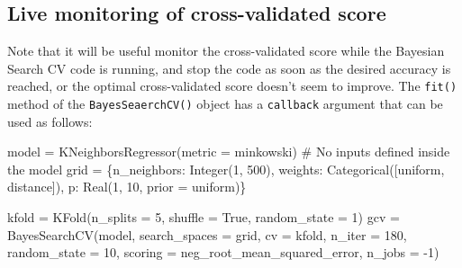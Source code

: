 \documentclass[
  letterpaper,
  DIV=11,
  numbers=noendperiod]{scrreprt}
\newenvironment{Shaded}{\begin{snugshade}}{\end{snugshade}}
\newcommand{\CommentTok}[1]{\textcolor[rgb]{0.37,0.37,0.37}{#1}}
\newcommand{\DecValTok}[1]{\textcolor[rgb]{0.68,0.00,0.00}{#1}}
\newcommand{\NormalTok}[1]{\textcolor[rgb]{0.00,0.23,0.31}{#1}}
\newcommand{\OperatorTok}[1]{\textcolor[rgb]{0.37,0.37,0.37}{#1}}
\newcommand{\StringTok}[1]{\textcolor[rgb]{0.13,0.47,0.30}{#1}}
\newcommand{\VariableTok}[1]{\textcolor[rgb]{0.07,0.07,0.07}{#1}}
\begin{document}
\subsection{Live monitoring of cross-validated
score}\label{live-monitoring-of-cross-validated-score}

Note that it will be useful monitor the cross-validated score while the
Bayesian Search CV code is running, and stop the code as soon as the
desired accuracy is reached, or the optimal cross-validated score
doesn't seem to improve. The \texttt{fit()} method of the
\texttt{BayesSeaerchCV()} object has a \texttt{callback} argument that
can be used as follows:

\begin{Shaded}
\begin{Highlighting}[]
\NormalTok{model }\OperatorTok{=}\NormalTok{ KNeighborsRegressor(metric }\OperatorTok{=} \StringTok{\textquotesingle{}minkowski\textquotesingle{}}\NormalTok{) }\CommentTok{\# No inputs defined inside the model}
\NormalTok{grid }\OperatorTok{=}\NormalTok{ \{}\StringTok{\textquotesingle{}n\_neighbors\textquotesingle{}}\NormalTok{: Integer(}\DecValTok{1}\NormalTok{, }\DecValTok{500}\NormalTok{), }\StringTok{\textquotesingle{}weights\textquotesingle{}}\NormalTok{: Categorical([}\StringTok{\textquotesingle{}uniform\textquotesingle{}}\NormalTok{, }\StringTok{\textquotesingle{}distance\textquotesingle{}}\NormalTok{]), }
       \StringTok{\textquotesingle{}p\textquotesingle{}}\NormalTok{: Real(}\DecValTok{1}\NormalTok{, }\DecValTok{10}\NormalTok{, prior }\OperatorTok{=} \StringTok{\textquotesingle{}uniform\textquotesingle{}}\NormalTok{)\} }

\NormalTok{kfold }\OperatorTok{=}\NormalTok{ KFold(n\_splits }\OperatorTok{=} \DecValTok{5}\NormalTok{, shuffle }\OperatorTok{=} \VariableTok{True}\NormalTok{, random\_state }\OperatorTok{=} \DecValTok{1}\NormalTok{)}
\NormalTok{gcv }\OperatorTok{=}\NormalTok{ BayesSearchCV(model, search\_spaces }\OperatorTok{=}\NormalTok{ grid, cv }\OperatorTok{=}\NormalTok{ kfold, n\_iter }\OperatorTok{=} \DecValTok{180}\NormalTok{, random\_state }\OperatorTok{=} \DecValTok{10}\NormalTok{,}
\NormalTok{                         scoring }\OperatorTok{=} \StringTok{\textquotesingle{}neg\_root\_mean\_squared\_error\textquotesingle{}}\NormalTok{, n\_jobs }\OperatorTok{=} \OperatorTok{{-}}\DecValTok{1}\NormalTok{)}
\end{Highlighting}
\end{Shaded}
\end{document}
